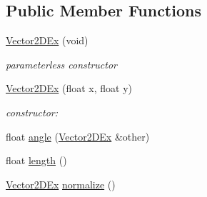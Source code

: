 \subsection*{\-Public \-Member \-Functions}
\begin{DoxyCompactItemize}
\item 
\hypertarget{class_vector2_d_ex_ab62463309be3636c4bc392b112d6d3d7}{
\hyperlink{class_vector2_d_ex_ab62463309be3636c4bc392b112d6d3d7}{\-Vector2\-D\-Ex} (void)}
\label{class_vector2_d_ex_ab62463309be3636c4bc392b112d6d3d7}

\begin{DoxyCompactList}\small\item\em parameterless constructor \end{DoxyCompactList}\item 
\hyperlink{class_vector2_d_ex_a26dabd1e9fea965c4038d1d9ca80cdb5}{\-Vector2\-D\-Ex} (float x, float y)
\begin{DoxyCompactList}\small\item\em constructor\-: \end{DoxyCompactList}\item 
float \hyperlink{class_vector2_d_ex_a474176502b57b6b227845f724e884f09}{angle} (\hyperlink{class_vector2_d_ex}{\-Vector2\-D\-Ex} \&other)
\item 
float \hyperlink{class_vector2_d_ex_a10544a1fe8d28a4deb72b41392411a39}{length} ()
\item 
\hypertarget{class_vector2_d_ex_a13058c50f93573bec5284e15f1dd193c}{
\hyperlink{class_vector2_d_ex}{\-Vector2\-D\-Ex} \hyperlink{class_vector2_d_ex_a13058c50f93573bec5284e15f1dd193c}{normalize} ()}
\label{class_vector2_d_ex_a13058c50f93573bec5284e15f1dd193c}


\end{DoxyCompactItemize}
